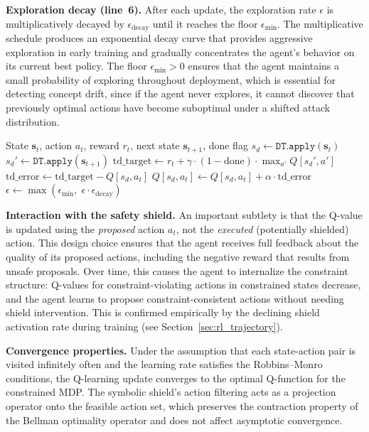 \documentclass[12pt, letterpaper, oneside]{report}
\newcommand{\bs}{\mathbf{s}}
\begin{document}
\textbf{Exploration decay (line~6).} After each update, the exploration rate $\epsilon$ is multiplicatively decayed by $\epsilon_{\text{decay}}$ until it reaches the floor $\epsilon_{\min}$. The multiplicative schedule produces an exponential decay curve that provides aggressive exploration in early training and gradually concentrates the agent's behavior on its current best policy. The floor $\epsilon_{\min} > 0$ ensures that the agent maintains a small probability of exploring throughout deployment, which is essential for detecting concept drift, since if the agent never explores, it cannot discover that previously optimal actions have become suboptimal under a shifted attack distribution.

\begin{algorithm}[htbp]
\caption{Q-Learning Update}
\label{alg:q_update}
\begin{algorithmic}[1]
\Require State $\bs_t$, action $a_t$, reward $r_t$, next state $\bs_{t+1}$, done flag
\State $s_d \leftarrow \texttt{DT.apply}(\bs_t)$
\State $s_d' \leftarrow \texttt{DT.apply}(\bs_{t+1})$
\State $\text{td\_target} \leftarrow r_t + \gamma \cdot (1 - \text{done}) \cdot \max_{a'} Q[s_d', a']$
\State $\text{td\_error} \leftarrow \text{td\_target} - Q[s_d, a_t]$
\State $Q[s_d, a_t] \leftarrow Q[s_d, a_t] + \alpha \cdot \text{td\_error}$
\State $\epsilon \leftarrow \max(\epsilon_{\min}, \; \epsilon \cdot \epsilon_{\text{decay}})$
\end{algorithmic}
\end{algorithm}

\textbf{Interaction with the safety shield.} An important subtlety is that the Q-value is updated using the \emph{proposed} action $a_t$, not the \emph{executed} (potentially shielded) action. This design choice ensures that the agent receives full feedback about the quality of its proposed actions, including the negative reward that results from unsafe proposals. Over time, this causes the agent to internalize the constraint structure: Q-values for constraint-violating actions in constrained states decrease, and the agent learns to propose constraint-consistent actions without needing shield intervention. This is confirmed empirically by the declining shield activation rate during training (see Section~\ref{sec:rl_trajectory}).

\textbf{Convergence properties.} Under the assumption that each state-action pair is visited infinitely often and the learning rate satisfies the Robbins--Monro conditions, the Q-learning update converges to the optimal Q-function for the constrained MDP. The symbolic shield's action filtering acts as a projection operator onto the feasible action set, which preserves the contraction property of the Bellman optimality operator and does not affect asymptotic convergence.
\end{document}
